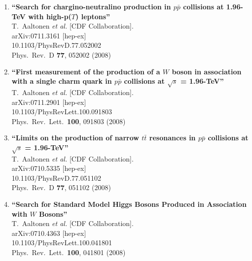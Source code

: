\documentclass{article}
\begin{document}
\begin{enumerate}
\item%
{\bf ``Search for chargino-neutralino production in $p \bar{p}$ collisions at 1.96-TeV with high-p($T$) leptons''}
  \\{}T.~Aaltonen {\it et al.}  [CDF Collaboration].
  \\{}arXiv:0711.3161 [hep-ex]
    \\{}10.1103/PhysRevD.77.052002
\\{}Phys.\ Rev.\ D {\bf 77}, 052002 (2008) %


\item%
{\bf ``First measurement of the production of a $W$ boson in association with a single charm quark in $p \bar{p}$ collisions at $\sqrt{s}$ = 1.96-TeV''}
  \\{}T.~Aaltonen {\it et al.}  [CDF Collaboration].
  \\{}arXiv:0711.2901 [hep-ex]
    \\{}10.1103/PhysRevLett.100.091803
\\{}Phys.\ Rev.\ Lett.\  {\bf 100}, 091803 (2008) %


\item%
{\bf ``Limits on the production of narrow $t \bar{t}$ resonances in $p \bar{p}$ collisions at $\sqrt{s}$ = 1.96-TeV''}
  \\{}T.~Aaltonen {\it et al.}  [CDF Collaboration].
  \\{}arXiv:0710.5335 [hep-ex]
    \\{}10.1103/PhysRevD.77.051102
\\{}Phys.\ Rev.\ D {\bf 77}, 051102 (2008) %


\item%
{\bf ``Search for Standard Model Higgs Bosons Produced in Association with $W$ Bosons''}
  \\{}T.~Aaltonen {\it et al.}  [CDF Collaboration].
  \\{}arXiv:0710.4363 [hep-ex]
    \\{}10.1103/PhysRevLett.100.041801
\\{}Phys.\ Rev.\ Lett.\  {\bf 100}, 041801 (2008) %



\end{enumerate}
\end{document}
